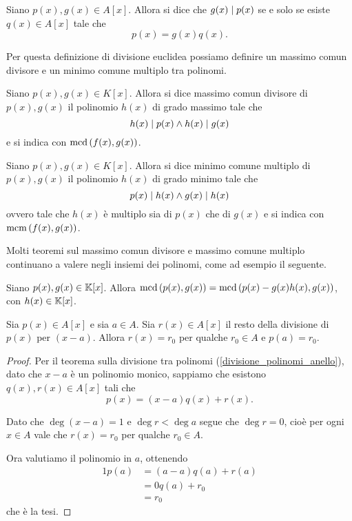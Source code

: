 \begin{definition}\label{divisione_polinomi_anello}
    Siano $p(x), g(x) \in A[x]$. Allora si dice che $g(x) \mid p(x)$ se e solo se esiste $q(x) \in A[x]$ tale che \[
        p(x) = g(x)q(x).    
    \]
\end{definition}

Per questa definizione di divisione euclidea possiamo definire un massimo comun divisore e un minimo comune multiplo tra polinomi.

\begin{definition}
    Siano $p(x), g(x) \in K[x]$. Allora si dice massimo comun divisore di $p(x), g(x)$ il polinomio $h(x)$ di grado massimo tale che \[
        h(x) \mid p(x) \land h(x) \mid g(x)    
    \] e si indica con $\operatorname{mcd}\left(f(x), g(x)\right)$.
\end{definition}

\begin{definition}
    Siano $p(x), g(x) \in K[x]$. Allora si dice minimo comune multiplo di $p(x), g(x)$ il polinomio $h(x)$ di grado minimo tale che \[
        p(x) \mid h(x) \land g(x) \mid h(x)  
    \] ovvero tale che $h(x)$ è multiplo sia di $p(x)$ che di $g(x)$ e si indica con $\operatorname{mcm}\left(f(x), g(x)\right)$.
\end{definition}

Molti teoremi sul massimo comun divisore e massimo comune multiplo continuano a valere negli insiemi dei polinomi, come ad esempio il seguente.

\begin{proposition}
    Siano $p(x), g(x) \in \mathbb{K}[x]$. Allora $\operatorname{mcd}\left(p(x), g(x)\right) = \operatorname{mcd}\left(p(x) - g(x)h(x), g(x)\right)$, con $h(x) \in \mathbb{K}[x]$.
\end{proposition}

\begin{proposition}\label{resto_uguale_valutazione_nel_punto}
    Sia $p(x) \in A[x]$ e sia $a \in A$. Sia $r(x) \in A[x]$ il resto della divisione di $p(x)$ per $(x-a)$. Allora $r(x) = r_0$ per qualche $r_0 \in A$ e $p(a) = r_0$.
\end{proposition}
\begin{proof}
    Per il teorema sulla divisione tra polinomi (\ref{divisione_polinomi_anello}), dato che $x-a$ è un polinomio monico, sappiamo che esistono $q(x), r(x) \in A[x]$ tali che \[
        p(x) = (x-a)q(x) + r(x).
    \]

    Dato che $\deg (x - a) = 1$ e $\deg r < \deg a$ segue che $\deg r = 0$, cioè per ogni $x \in A$ vale che $r(x) = r_0$ per qualche $r_0 \in A$.

    Ora valutiamo il polinomio in $a$, ottenendo \begin{alignat*}
        {1}
        p(a) &= (a-a)q(a) + r(a)\\
        &= 0q(a) + r_0\\
        &= r_0
    \end{alignat*}
    che è la tesi.
\end{proof}

